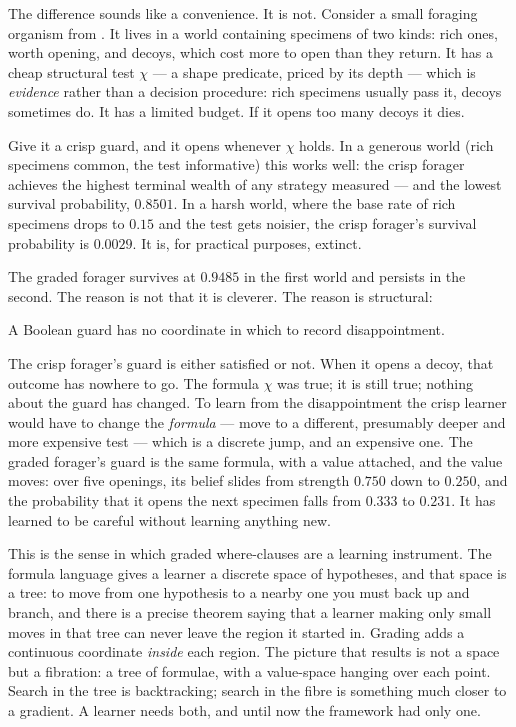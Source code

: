 The difference sounds like a convenience. It is not. Consider a small foraging
organism from \cite{GradedWhere}. It lives in a world containing specimens of two
kinds: rich ones, worth opening, and decoys, which cost more to open than they
return. It has a cheap structural test $\chi$ --- a shape predicate, priced by its
depth --- which is \emph{evidence} rather than a decision procedure: rich specimens
usually pass it, decoys sometimes do. It has a limited budget. If it opens too many
decoys it dies.

Give it a crisp guard, and it opens whenever $\chi$ holds. In a generous world
(rich specimens common, the test informative) this works well: the crisp forager
achieves the highest terminal wealth of any strategy measured --- and the lowest
survival probability, $0.8501$. In a harsh world, where the base rate of rich
specimens drops to $0.15$ and the test gets noisier, the crisp forager's survival
probability is $0.0029$. It is, for practical purposes, extinct.

The graded forager survives at $0.9485$ in the first world and persists in the
second. The reason is not that it is cleverer. The reason is structural:

\begin{slogan}
A Boolean guard has no coordinate in which to record disappointment.
\end{slogan}

The crisp forager's guard is either satisfied or not. When it opens a decoy, that
outcome has nowhere to go. The formula $\chi$ was true; it is still true; nothing
about the guard has changed. To learn from the disappointment the crisp learner
would have to change the \emph{formula} --- move to a different, presumably deeper
and more expensive test --- which is a discrete jump, and an expensive one. The
graded forager's guard is the same formula, with a value attached, and the value
moves: over five openings, its belief slides from strength $0.750$ down to
$0.250$, and the probability that it opens the next specimen falls from $0.333$ to
$0.231$. It has learned to be careful without learning anything new.

This is the sense in which graded where-clauses are a learning instrument. The
formula language gives a learner a discrete space of hypotheses, and that space is
a tree: to move from one hypothesis to a nearby one you must back up and branch,
and there is a precise theorem \cite{ScientistNote} saying that a learner making
only small moves in that tree can never leave the region it started in. Grading
adds a continuous coordinate \emph{inside} each region. The picture that results
is not a space but a fibration: a tree of formulae, with a value-space hanging
over each point. Search in the tree is backtracking; search in the fibre is
something much closer to a gradient. A learner needs both, and until now the
framework had only one.

